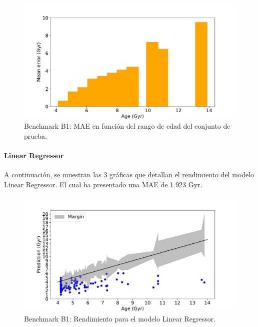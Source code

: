 \begin{figure}[H]
\begin{center}
 \includegraphics[width=0.8\linewidth]{Figuras/Experimentos/B_B1_dtr_3.pdf}
\end{center}
\caption{Benchmark B1: MAE en función del rango de edad del conjunto de prueba.}
 \label{fig:benchB1_details_dtr_3}
\end{figure}

\paragraph{Linear Regressor} 
A continuación, se muestran las 3 gráficas que detallan el rendimiento del modelo Linear Regressor. El cual ha presentado una MAE de 1.923 Gyr.

\begin{figure}[H]
\begin{center}
 \includegraphics[width=0.8\linewidth]{Figuras/Experimentos/B_B1_lr_1.pdf}
\end{center}
\caption{Benchmark B1: Rendimiento para el modelo Linear Regressor.}
 \label{fig:benchB1_details_lr_1}
\end{figure}

